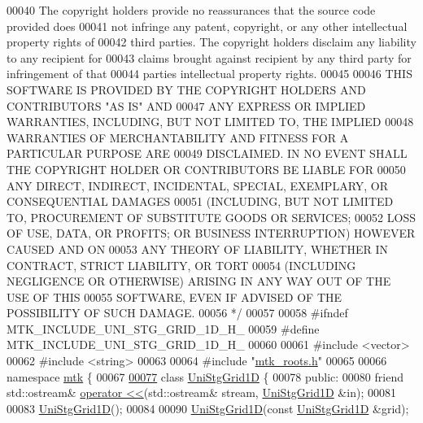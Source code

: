 \begin{DoxyCode}
00040 \textcolor{comment}{The copyright holders provide no reassurances that the source code provided does}
00041 \textcolor{comment}{not infringe any patent, copyright, or any other intellectual property rights of}
00042 \textcolor{comment}{third parties. The copyright holders disclaim any liability to any recipient for}
00043 \textcolor{comment}{claims brought against recipient by any third party for infringement of that}
00044 \textcolor{comment}{parties intellectual property rights.}
00045 \textcolor{comment}{}
00046 \textcolor{comment}{THIS SOFTWARE IS PROVIDED BY THE COPYRIGHT HOLDERS AND CONTRIBUTORS "AS IS" AND}
00047 \textcolor{comment}{ANY EXPRESS OR IMPLIED WARRANTIES, INCLUDING, BUT NOT LIMITED TO, THE IMPLIED}
00048 \textcolor{comment}{WARRANTIES OF MERCHANTABILITY AND FITNESS FOR A PARTICULAR PURPOSE ARE}
00049 \textcolor{comment}{DISCLAIMED. IN NO EVENT SHALL THE COPYRIGHT HOLDER OR CONTRIBUTORS BE LIABLE FOR}
00050 \textcolor{comment}{ANY DIRECT, INDIRECT, INCIDENTAL, SPECIAL, EXEMPLARY, OR CONSEQUENTIAL DAMAGES}
00051 \textcolor{comment}{(INCLUDING, BUT NOT LIMITED TO, PROCUREMENT OF SUBSTITUTE GOODS OR SERVICES;}
00052 \textcolor{comment}{LOSS OF USE, DATA, OR PROFITS; OR BUSINESS INTERRUPTION) HOWEVER CAUSED AND ON}
00053 \textcolor{comment}{ANY THEORY OF LIABILITY, WHETHER IN CONTRACT, STRICT LIABILITY, OR TORT}
00054 \textcolor{comment}{(INCLUDING NEGLIGENCE OR OTHERWISE) ARISING IN ANY WAY OUT OF THE USE OF THIS}
00055 \textcolor{comment}{SOFTWARE, EVEN IF ADVISED OF THE POSSIBILITY OF SUCH DAMAGE.}
00056 \textcolor{comment}{*/}
00057 
00058 \textcolor{preprocessor}{#ifndef MTK\_INCLUDE\_UNI\_STG\_GRID\_1D\_H\_}
00059 \textcolor{preprocessor}{#define MTK\_INCLUDE\_UNI\_STG\_GRID\_1D\_H\_}
00060 
00061 \textcolor{preprocessor}{#include <vector>}
00062 \textcolor{preprocessor}{#include <string>}
00063 
00064 \textcolor{preprocessor}{#include "\hyperlink{mtk__roots_8h}{mtk\_roots.h}"}
00065 
00066 \textcolor{keyword}{namespace }\hyperlink{namespacemtk}{mtk} \{
00067 
\hypertarget{mtk__uni__stg__grid__1d_8h_source_l00077}{}\hyperlink{classmtk_1_1UniStgGrid1D}{00077} \textcolor{keyword}{class }\hyperlink{classmtk_1_1UniStgGrid1D}{UniStgGrid1D} \{
00078  \textcolor{keyword}{public}:
00080   \textcolor{keyword}{friend} std::ostream& \hyperlink{classmtk_1_1UniStgGrid1D_af968dff5cf550099c6917b8c1ea18e09}{operator <<}(std::ostream& stream, \hyperlink{classmtk_1_1UniStgGrid1D}{UniStgGrid1D} &in);
00081 
00083   \hyperlink{classmtk_1_1UniStgGrid1D_ab0c1bb8afad2420fdb4434eb21bdec82}{UniStgGrid1D}();
00084 
00090   \hyperlink{classmtk_1_1UniStgGrid1D_ab0c1bb8afad2420fdb4434eb21bdec82}{UniStgGrid1D}(\textcolor{keyword}{const} \hyperlink{classmtk_1_1UniStgGrid1D}{UniStgGrid1D} &grid);

\end{DoxyCode}
